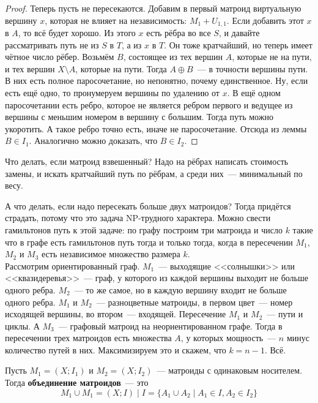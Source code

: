 \documentclass{article}
\begin{document}
\begin{proof}
        Теперь пусть не пересекаются. Добавим в первый матроид виртуальную вершину $x$, которая не влияет на независимость: $M_1+U_{1,1}$. Если добавить этот $x$ в $A$, то всё будет хорошо. Из этого $x$ есть рёбра во все $S$, и давайте рассматривать путь не из $S$ в $T$, а из $x$ в $T$. Он тоже кратчайший, но теперь имеет чётное число рёбер. Возьмём $B$, состоящее из тех вершин $A$, которые не на пути, и тех вершин $X\setminus A$, которые на пути. Тогда $A\oplus B$~--- в точности вершины пути. В них есть полное паросочетание, но непонятно, почему единственное. Ну, если есть ещё одно, то пронумеруем вершины по удалению от $x$. В ещё одном паросочетании есть ребро, которое не является ребром первого и ведущее из вершины с меньшим номером в вершину с большим. Тогда путь можно укоротить. А такое ребро точно есть, иначе не паросочетание. Отсюда из леммы $B\in I_1$. Аналогично можно доказать, что $B\in I_2$.
    \end{proof}
    \begin{remark}
        Что делать, если матроид взвешенный? Надо на рёбрах написать стоимость замены, и искать кратчайший путь по рёбрам, а среди них~--- минимальный по весу.
    \end{remark}
    \begin{remark}
        А что делать, если надо пересекать больше двух матроидов? Тогда придётся страдать, потому что это задача NP-трудного характера. Можно свести гамильтонов путь к этой задаче: по графу построим три матроида и число $k$ такие что в графе есть гамильтонов путь тогда и только тогда, когда в пересечении $M_1$, $M_2$ и $M_3$ есть независимое множество размера $k$.\\
        Рассмотрим ориентированный граф. $M_1$~--- выходящие <<солнышки>> или <<квазидеревья>>~--- граф, у которого из каждой вершины выходит не больше одного ребра. $M_2$~--- то же самое, но в каждую вершину входит не больше одного ребра. $M_1$ и $M_2$~--- разноцветные матроиды, в первом цвет~--- номер исходящей вершины, во втором~--- входящей. Пересечение $M_1$ и $M_2$~--- пути и циклы. А $M_3$~--- графовый матроид на неориентированном графе. Тогда в пересечении трех матроидов есть множества $A$, у которых мощность~--- $n$ минус количество путей в них. Максимизируем это и скажем, что $k=n-1$. Всё.
    \end{remark}
    \begin{definition}
        Пусть $M_1=(X;I_1)$ и $M_2=(X;I_2)$~--- матроиды с одинаковым носителем. Тогда \textbf{объединение матроидов}~--- это
        $$
        M_1\cup M_1=(X;I)\mid I=\{A_1\cup A_2\mid A_1\in I,A_2\in I_2\}
        $$
    \end{definition}
\end{document}

